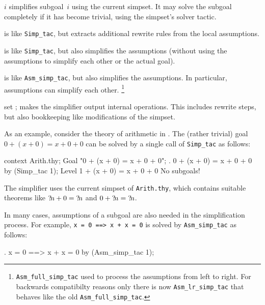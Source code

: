 \begin{ttdescription}
\item[\ttindexbold{Simp_tac} $i$] simplifies subgoal~$i$ using the
  current simpset.  It may solve the subgoal completely if it has
  become trivial, using the simpset's solver tactic.
  
\item[\ttindexbold{Asm_simp_tac}]
  is like \verb$Simp_tac$, but extracts additional rewrite rules from
  the local assumptions.
  
\item[\ttindexbold{Full_simp_tac}] is like \verb$Simp_tac$, but also
  simplifies the assumptions (without using the assumptions to
  simplify each other or the actual goal).
  
\item[\ttindexbold{Asm_full_simp_tac}] is like \verb$Asm_simp_tac$,
  but also simplifies the assumptions. In particular, assumptions can
  simplify each other.
\footnote{\texttt{Asm_full_simp_tac} used to process the assumptions from
  left to right. For backwards compatibilty reasons only there is now
  \texttt{Asm_lr_simp_tac} that behaves like the old \texttt{Asm_full_simp_tac}.}
\item[set \ttindexbold{trace_simp};] makes the simplifier output
  internal operations.  This includes rewrite steps, but also
  bookkeeping like modifications of the simpset.
\end{ttdescription}

\medskip

As an example, consider the theory of arithmetic in \HOL.  The (rather
trivial) goal $0 + (x + 0) = x + 0 + 0$ can be solved by a single call
of \texttt{Simp_tac} as follows:
\begin{ttbox}
context Arith.thy;
Goal "0 + (x + 0) = x + 0 + 0";
{. 0 + (x + 0) = x + 0 + 0}
by (Simp_tac 1);
{\out Level 1}
{ + (x + 0) = x + 0 + 0}
{\out No subgoals!}
\end{ttbox}

The simplifier uses the current simpset of \texttt{Arith.thy}, which
contains suitable theorems like ${?\!n}+0 = {?\!n}$ and $0+{?\!n} =
{?\!n}$.

\medskip In many cases, assumptions of a subgoal are also needed in
the simplification process.  For example, \texttt{x = 0 ==> x + x = 0}
is solved by \texttt{Asm_simp_tac} as follows:
\begin{ttbox}
{. x = 0 ==> x + x = 0}
by (Asm_simp_tac 1);
\end{ttbox}

